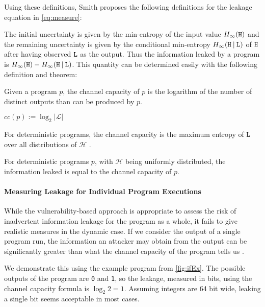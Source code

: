 Using these definitions, Smith \cite{smith09} proposes the following definitions for the leakage equation in \ref{eq:measure}:

The initial uncertainty is given by the min-entropy of the input value $H_\infty(\mathtt{H})$ and the remaining uncertainty is given by the conditional min-entropy $H_\infty(\mathtt{H} \: | \: \mathtt{L})$ of $\mathtt{H}$ after having observed $\mathtt{L}$ as the output. Thus the information leaked by a program is $H_\infty(\mathtt{H}) - H_\infty(\mathtt{H} \: | \: \mathtt{L})$. This quantity can be determined easily with the following definition and theorem:

\begin{definition}
    Given a program $p$, the channel capacity of $p$ is the logarithm of the number of distinct outputs than can be produced by $p$.
    \begin{center}
        $cc(p) := \log_2 |\mathcal{L}|$
    \end{center}
    For deterministic programs, the channel capacity is the maximum entropy of $\mathtt{L}$ over all distributions of $\mathcal{H}$ \cite{smith09}.
\end{definition}

\begin{theorem}
    For deterministic programs $p$, with $\mathcal{H}$ being uniformly distributed, the information leaked is equal to the channel capacity of $p$.
\end{theorem}

\paragraph{Measuring Leakage for Individual Program Executions}
While the vulnerability-based approach is appropriate to assess the risk of inadvertent information leakage for the program as a whole, it fails to give realistic measures in the dynamic case. If we consider the output of a single program run, the information an attacker may obtain from the output can be significantly greater than what the channel capacity of the program tells us  \cite{bielova16}.

We demonstrate this using the example program from \ref{fig:ifEx}. The possible outputs of the program are \texttt{0} and \texttt{1}, so the leakage, measured in bits, using the channel capacity formula is $\log_2 2 = 1$. Assuming integers are 64 bit wide, leaking a single bit seems acceptable in most cases.

